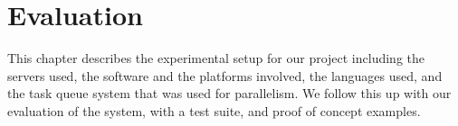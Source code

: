 \chapter{Evaluation}
This chapter describes the experimental setup for our project including the servers used, the software and the platforms involved, the languages used, and the task queue system that was used for parallelism. We follow this up with our evaluation of the system, with a test suite, and proof of concept examples.






